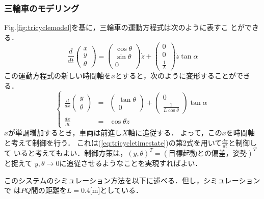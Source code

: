 \begin{frame}[t] 
\frametitle{三輪車のモデリング}


Fig.\ref{fig:tricyclemodel}を基に，三輪車の運動方程式は次のように表すこ
とができる．
\begin{equation}
\frac{d}{dt}
 \left(
  \begin{array}{c}
   x \\
   y \\
   \theta 
  \end{array}
 \right) =
 \left(
  \begin{array}{c}
   \cos \theta \\
   \sin \theta \\
   0
  \end{array}
 \right) \dot{z} +
 \left(
  \begin{array}{c}
   0 \\
   0 \\
   \frac{1}{L}
  \end{array}
 \right) \dot{z} \tan \alpha
\end{equation}
この運動方程式の新しい時間軸を$x$とすると，次のように変形することができ
る．
\begin{equation}
 \left\{
  \begin{array}{rcl}
   \displaystyle \frac{d}{dx}
    \left(
     \begin{array}{c}
      y \\
      \theta 
     \end{array}
    \right) &=&
    \left(
     \begin{array}{c}
      \tan \theta \\
      0 
     \end{array}
    \right) +
    \left(
     \begin{array}{c}
      0 \\
      \frac{1}{L \cos \theta}
     \end{array}
    \right) \tan \alpha \\
 \displaystyle \frac{dx}{dt} &=& \cos \theta \dot{z}
  \end{array}\right.
 \label{eq:tricycletimestate}
\end{equation}
$x$が単調増加するとき，車両は前進し$X$軸に追従する．
よって，この$x$を時間軸と考えて制御を行う．
これは(\ref{eq:tricycletimestate})の第2式を用いて$\frac{dx}{dt}$と制御して
いると考えてもよい．制御方策は，$(y, \theta)^T = (\mbox{目標起動との偏差，姿勢})^T$
と捉えて
$y, \theta \rightarrow 0$に追従させるようなことを実現すればよい．

このシステムのシミュレーション方法を以下に述べる．但し，シミュレーションで
は$PQ$間の距離を$L = 0.4$[m]としている．


\end{frame}

